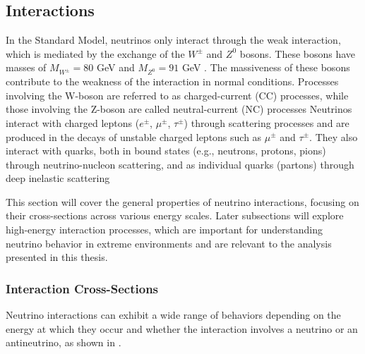 \subsection{Interactions}
\label{sec:nu_interactions}
In the Standard Model, neutrinos only interact through the weak interaction, which is mediated by the exchange of the $W^{\pm}$ and $Z^0$ bosons. These bosons have masses of $M_{W^{\pm}}=80$ GeV  and $M_{Z^0}=91$ GeV . The massiveness of these bosons contribute to the weakness of the interaction in normal conditions. Processes involving the W-boson are referred to as charged-current (CC) processes, while those involving the Z-boson are called neutral-current (NC) processes Neutrinos interact with charged leptons ($e^{\pm}$, $\mu^{\pm}$, $\tau^{\pm}$) through scattering processes and are produced in the decays of unstable charged leptons such as $\mu^{\pm}$ and $\tau^{\pm}$. They also interact with quarks, both in bound states (e.g., neutrons, protons, pions) through neutrino-nucleon scattering, and as individual quarks (partons) through deep inelastic scattering

This section will cover the general properties of neutrino interactions, focusing on their cross-sections across various energy scales. Later subsections will explore high-energy interaction processes, which are important for understanding neutrino behavior in extreme environments and are relevant to the analysis presented in this thesis.

\subsubsection*{Interaction Cross-Sections}
\label{sec:xsec}
Neutrino interactions can exhibit a wide range of behaviors  depending on the energy at which they occur and whether the interaction involves a neutrino or an antineutrino, as shown in . 

